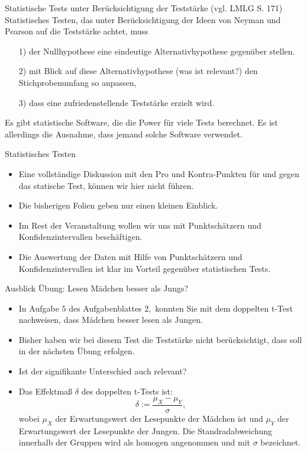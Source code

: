 \documentclass[usenames,dvipsnames,handout]{beamer}
\begin{document}
\begin{frame}{Statistische Tests unter Berücksichtigung der Teststärke (vgl. LMLG S. 171)}
Statistisches Testen, das unter Berücksichtigung der Ideen von Neyman und Pearson auf die Teststärke 
achtet, muss
\begin{itemize}
\item[1)]{der Nullhypothese eine eindeutige Alternativhypothese gegenüber stellen.}
\item[2)]{mit Blick auf diese Alternativhypothese (was ist relevant?) den Stichprobenumfang so
anpassen,}
\item[3)]{dass eine zufriedenstellende Teststärke erzielt wird.}
\end{itemize}\pause
Es gibt statistische Software, die die Power  für viele Tests berechnet. Es ist allerdings
die Ausnahme, dass jemand solche Software verwendet.
\end{frame}
\begin{frame}{Statistisches Testen}
\begin{itemize}
\item{Eine vollständige Diskussion mit den Pro und Kontra-Punkten für und gegen das 
statische Test, können wir hier nicht führen.}
\item{Die bisherigen Folien geben nur einen kleinen Einblick.}
\item{Im Rest der Veranstaltung wollen wir uns mit Punktschätzern und Konfidenzintervallen
beschäftigen.}
\item{Die Auswertung der Daten mit Hilfe von Punktschätzern und Konfidenzintervallen
ist klar im Vorteil gegenüber statistischen Tests.}
\end{itemize}
\end{frame}
\begin{frame}{Ausblick Übung: Lesen Mädchen besser als Jungs?}
\begin{itemize}
\item{In Aufgabe $5$ des Aufgabenblattes $2,$ konnten Sie mit dem doppelten t-Test nachweisen,
dass Mädchen besser lesen als Jungen.}\pause
\item{Bisher haben wir bei diesem Test die Teststärke nicht berücksichtigt, dass soll in der nächsten
Übung erfolgen.}\pause
\item{Ist der signifikante Unterschied auch relevant? }\pause
\item{Das Effektmaß $\delta$ des doppelten t-Tests ist: $$\delta:=\frac{\mu_{X}-\mu_{Y}}{\sigma},$$
wobei $\mu_{X}$ der Erwartungswert der Lesepunkte der Mädchen ist und 
$\mu_{Y}$ der Erwartungswert der Lesepunkte der Jungen. Die Standradabweichung innerhalb der 
Gruppen wird als homogen angenommen und mit $\sigma$ bezeichnet. }
\end{itemize}
\end{frame}
\end{document}

